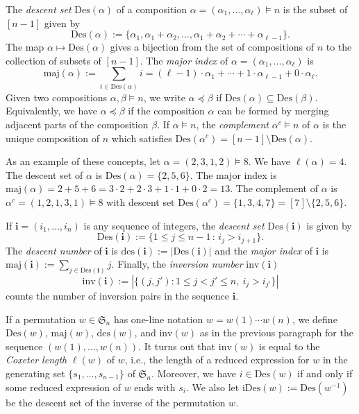 \documentclass[10pt]{amsart}
\theoremstyle{definition}
\newcommand{\maj}{{\mathrm {maj}}}
\newcommand{\inv}{{\mathrm {inv}}}
\newcommand{\Des}{{\mathrm {Des}}}
\newcommand{\des}{{\mathrm {des}}}
\newcommand{\iDes}{{\mathrm {iDes}}}
\newcommand{\symm}{{\mathfrak{S}}}
\newcommand{\ii}{{\mathbf{i}}}
\begin{document}
The \emph{descent set} $\Des(\alpha)$ of a composition $\alpha = (\alpha_1, \dots, \alpha_{\ell}) \models n$ is the subset of $[n-1]$ given by
\begin{equation}
\Des(\alpha) := \{\alpha_1, \alpha_1 + \alpha_2, \dots, \alpha_1 + \alpha_2 + \cdots + \alpha_{\ell - 1} \}.
\end{equation}
The map $\alpha \mapsto \Des(\alpha)$ gives a bijection from the set of compositions of $n$ to the collection  
of subsets of $[n-1]$.
The \emph{major index} of $\alpha = (\alpha_1, \dots, \alpha_{\ell})$
is 
\begin{equation}
\maj(\alpha) := \sum_{i\in\Des(\alpha)} i = (\ell - 1) \cdot \alpha_1 + \cdots + 1 \cdot \alpha_{\ell-1} + 0 \cdot \alpha_{\ell}.
\end{equation}
Given two compositions $\alpha, \beta \models n$, we write $\alpha \preceq \beta$ if 
$\Des(\alpha) \subseteq \Des(\beta)$.  Equivalently, we have $\alpha \preceq \beta$ if the composition $\alpha$
can be formed by merging adjacent parts of the composition $\beta$.  
If $\alpha \models n$, the \emph{complement} $\alpha^c \models n$ of $\alpha$ is the unique composition of $n$
which satisfies $\Des(\alpha^c) = [n-1] \setminus \Des(\alpha)$.


As an example of these concepts, let $\alpha = (2,3,1,2) \models 8$.  We have $\ell(\alpha) = 4$. 
The descent set of $\alpha$ is $\Des(\alpha) = \{2,5,6\}$.
The major index is $\maj(\alpha) = 2+5+6 = 3 \cdot 2 + 2 \cdot 3 + 1 \cdot 1 + 0 \cdot 2 = 13$.
The complement of $\alpha$ is $\alpha^c = (1,2,1,3,1) \models 8$ with descent set $\Des(\alpha^c) = \{1,3,4,7\} = [7]\setminus\{2,5,6\}$.  



If $\ii = (i_1, \dots, i_n)$ is any sequence of  integers, the \emph{descent set}
$\Des(\ii)$ is given by
\begin{equation}
\Des(\ii) := \{1 \leq j \leq n-1 \,:\, i_j > i_{j+1} \}.
\end{equation}
The \emph{descent number} of $\ii$ is $\des(\ii) := |\Des(\ii)|$ and the \emph{major index} of $\ii$ is $\maj(\ii) := \sum_{j \in \Des(\ii)} j$.
Finally, the \emph{inversion number} $\inv(\ii)$ 
\begin{equation}
\inv(\ii) := | \{ (j,j') : 1\le j<j'\le n,\ i_j > i_{j'} \}|
\end{equation}
counts the number of inversion pairs in the sequence $\ii$.

If a permutation $w \in \symm_n$ has one-line notation $w = w(1) \cdots w(n)$, we define 
$\Des(w)$, $\maj(w)$, $\des(w)$, and $\inv(w)$ as in the previous paragraph for the sequence $(w(1),\ldots,w(n))$.
It turns out that $\inv(w)$ is equal to the \emph{Coxeter length} $\ell(w)$ of $w$, i.e., the length of
a reduced expression for $w$ in the generating set $\{s_1, \dots, s_{n-1}\}$ of 
$\symm_n$.
Moreover, we have $i\in\Des(w)$ if and only if some reduced expression of $w$ ends with $s_i$.
We also let $\iDes(w) := \Des(w^{-1})$ be the descent set of the inverse of the permutation $w$.
\end{document}
